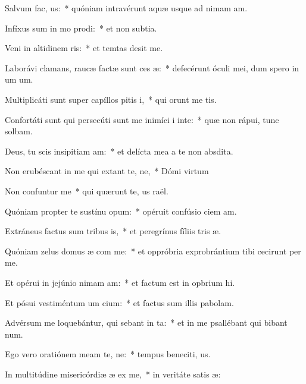 \item Salvum  fac, us:~* quóniam intravérunt aquæ usque ad nimam am.
\item Infíxus sum in mo prodi:~* et non  subtia.
\item Veni in altidinem ris:~* et temtas desit me.
\item Laborávi clamans, raucæ factæ sunt ces æ:~* defecérunt óculi mei, dum spero in um um.
\item Multiplicáti sunt super capíllos pitis i,~* qui orunt me tis.
\item Confortáti sunt qui persecúti sunt me inimíci i inte:~* quæ non rápui, tunc solbam.
\item Deus, tu scis insipitiam am:~* et delícta mea a te non  absdita.
\item Non erubéscant in me qui extant te, ne,~* Dómi virtum
\item Non confuntur  me~* qui quærunt te, us raël.
\item Quóniam propter te sustínu opum:~* opéruit confúsio ciem am.
\item Extráneus factus sum tribus is,~* et peregrínus fíliis tris æ.
\item Quóniam zelus domus æ com me:~* et oppróbria exprobrántium tibi cecirunt per me.
\item Et opérui in jejúnio nimam am:~* et factum est in opbrium hi.
\item Et pósui vestiméntum um cium:~* et factus sum illis  pabolam.
\item Advérsum me loquebántur, qui sebant in ta:~* et in me psallébant qui bibant num.
\item Ego vero oratiónem meam  te, ne:~* tempus beneciti, us.
\item In multitúdine misericórdiæ æ ex me,~* in veritáte satis æ:
